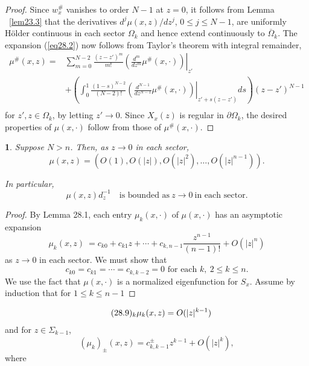 \documentclass{surv-l}
\theoremstyle{plain}
\newtheorem{prop}[theorem]{\sc{Proposition}}
\theoremstyle{definition}
\numberwithin{equation}{chapter}
\begin{document}
\begin{proof} Since $w_{x}^{\#}$ vanishes to order $N-1$ at $z=0$, it follows from Lemma ~\ref{lem23.3} that the derivatives $d^{j}\mu(x, z)/dz^{j}$, $0\leq j\leq N-1$, are uniformly H\"{o}lder continuous in each sector $\Omega_{k}$ and hence extend continuously to $\overline{\Omega}_{k}$. The expansion (\ref{eq28.2}) now follows from Taylor's theorem with integral remainder,
\begin{align*}
\mu^{\#}(x, z)= &\sum_{m=0}^{N-2}\frac{(z-z')^{m}}{m!}\left.\left(\frac{d^{m}}{dz^{m}}\mu^{\#}(x, \cdot)\right)\right|_{z'}\\
&+\left(\int_{0}^{1}\frac{(1-s)^{N-2}}{(N-2)!}\left.\left(\frac{d^{N-1}}{dz^{N-1}}\mu^{\#}(x, \cdot)\right)\right|_{z'+s(z-z')}ds\right)(z-z')^{N-1}\\
\end{align*}
for $z',z\in\Omega_{k}$, by letting $z'\rightarrow 0$. Since $X_{x}(z)$ is regular in $\partial\Omega_{k}$, the desired properties of $\mu(x, \cdot)$ follow from those of $\mu^{\#}(x, \cdot)$.
\end{proof}
\setcounter{theorem}{3}
\begin{prop}\label{prop28.4} Suppose $N>n$. Then, as $z \rightarrow 0$ in each sector,
\setcounter{equation}{4}
\begin{equation}
\mu(x,z)=(O(1),O(|z|),O(|z|^{2}),\ldots,O(|z|^{n-1})).
\end{equation}

In  particular,
\begin{equation}\label{eq28.6}
\mu(x, z)d_{z}^{-1}\quad \text{is bounded as}\ z\rightarrow 0\ \text{in each sector}.
\end{equation}
\end{prop}

\begin{proof} By Lemma 28.1, each entry $\mu_{k}(x,\cdot)$ of $\mu(x,\cdot)$ has an asymptotic expansion
\begin{equation}\label{eq28.7}
\mu_{k}(x, z)\ =c_{k0}+c_{k1}z+\cdots +c_{k,n-1}\frac{z^{n-1}}{(n-1)!}+O(|z|^{n})
\end{equation}
as $z\rightarrow 0$ in each sector. We must show that
\begin{equation}\label{eq28.8}
c_{k0}=c_{k1}=\cdots =c_{k,k-2}=0\text{ for each } k,\ 2\leq k\leq n.
\end{equation}
We use the fact that $\mu(x, \cdot)$ is a normalized eigenfunction for $S_{x}$. Assume by induction that for $1\leq
k\leq n-1$
\end{proof}
\begin{align*}\tag*{$(28.9)_{k}$}
&\mu_{k}(x, z)=O(|z|^{k-1})
\end{align*}
and for $z\in\Sigma_{k-1}$,
\begin{equation*}
(\mu_{k})_{\pm}(x,z)=c_{k,k-1}^{\pm}z^{k-1}+O(|z|^{k}),
\end{equation*}
where
\end{document}
